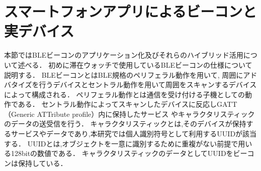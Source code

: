 \section{スマートフォンアプリによるビーコンと実デバイス}\label{4.3}
本節ではBLEビーコンのアプリケーション化及びそれらのハイブリッド活用について述べる．
初めに滞在ウォッチで使用しているBLEビーコンの仕様について説明する．
BLEビーコンとはBLE規格のペリフェラル動作を用いて,
周囲にアドバタイズを行うデバイスとセントラル動作を用いて周囲をスキャンするデバイスによって構成される．
ペリフェラル動作とは通信を受け付ける子機としての動作である．
セントラル動作によってスキャンしたデバイスに反応しGATT（Generic ATTribute profile）内に保持したサービス
やキャラクタリスティックのデータの送受信を行う．
キャラクタリスティックとは,そのデバイスが保持するサービスやデータであり,本研究では個人識別符号として利用するUUIDが該当する．
UUIDとは,オブジェクトを一意に識別するために重複がない前提で用いる128bitの数値である．
キャラクタリスティックのデータとしてUUIDをビーコンは保持している．









